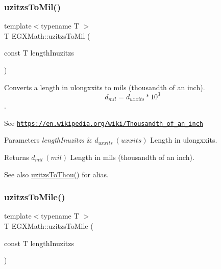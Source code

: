 \subsubsection{\texorpdfstring{uzitzs\+To\+Mil()}{uzitzsToMil()}}
{\footnotesize\ttfamily template$<$typename T $>$ \\
T E\+G\+X\+Math\+::uzitzs\+To\+Mil (\begin{DoxyParamCaption}\item[{const T}]{length\+Inuzitzs }\end{DoxyParamCaption})}



Converts a length in ulongxxits to mils (thousandth of an inch). \[ d_{mil}=d_{uxxits} * 10^{3} \]. 

See \href{https://en.wikipedia.org/wiki/Thousandth_of_an_inch}{\tt https\+://en.\+wikipedia.\+org/wiki/\+Thousandth\+\_\+of\+\_\+an\+\_\+inch} 
\begin{DoxyParams}{Parameters}
{\em length\+Inuzitzs} & $ d_{uxxits}\ (uxxits)$ Length in ulongxxits. \\
\hline
\end{DoxyParams}
\begin{DoxyReturn}{Returns}
$ d_{mil}\ (mil)$ Length in mils (thousandth of an inch). 
\end{DoxyReturn}
\begin{DoxySeeAlso}{See also}
\mbox{\hyperlink{group___e_g_x_math-_conversions-_length_conversions-uzitzs-_imperial_gaa11694f9026bf30e29bd716a35c05b4e}{uzitzs\+To\+Thou()}} for alias. 
\end{DoxySeeAlso}
\mbox{\label{group___e_g_x_math-_conversions-_length_conversions-uzitzs-_imperial_ga3396c913e6937eee49337db8fac05ca7}} 
\subsubsection{\texorpdfstring{uzitzs\+To\+Mile()}{uzitzsToMile()}}
{\footnotesize\ttfamily template$<$typename T $>$ \\
T E\+G\+X\+Math\+::uzitzs\+To\+Mile (\begin{DoxyParamCaption}\item[{const T}]{length\+Inuzitzs }\end{DoxyParamCaption})}



